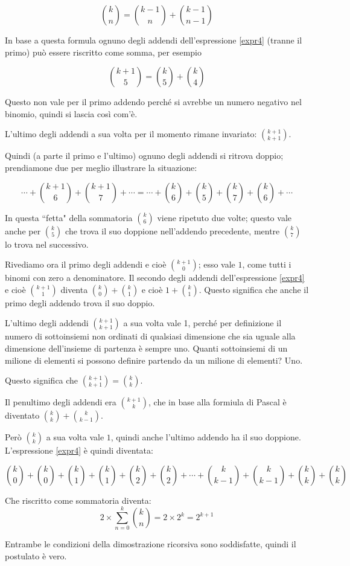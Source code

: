 \begin{equation*}
{k \choose n}={k-1 \choose n}+{k-1 \choose n-1}
\end{equation*}

In base a questa formula ognuno degli addendi dell'espressione \ref{expr4} (tranne il primo) può essere riscritto come somma, per esempio


\begin{equation*}
{k+1 \choose 5}={k \choose 5}+{k \choose 4}
\end{equation*}

Questo non vale per il primo addendo perché si avrebbe un numero negativo nel binomio, quindi si lascia così com'è.

L'ultimo degli addendi a sua volta per il momento rimane invariato: ${k+1\choose k+1}$.

Quindi (a parte il primo e l'ultimo) ognuno degli addendi si ritrova doppio; prendiamone due per meglio illustrare la situazione:

\begin{equation*}
\cdots+{k+1\choose 6}+{k+1\choose 7}+\cdots
=
\cdots+{k\choose 6}+{k \choose 5}+{k\choose 7}+{k\choose 6}+\cdots
\end{equation*}

In questa ``fetta" della sommatoria ${k\choose 6}$ viene ripetuto due volte; questo vale anche per ${k\choose 5}$ che trova il suo doppione nell'addendo precedente, mentre ${k \choose 7}$ lo trova nel successivo.

Rivediamo ora il primo degli addendi e cioè ${k+1 \choose 0}$; esso vale $1$, come tutti i binomi con zero a denominatore.
Il secondo degli addendi dell'espressione \ref{expr4} e cioè ${k+1\choose 1}$ diventa ${k\choose 0}+{k\choose 1}$ e cioè $1+{k\choose 1}$.  Questo significa che anche il primo degli addendo trova il suo doppio.

L'ultimo degli addendi ${k+1\choose k+1}$ a sua volta vale 1, perché per definizione il numero di sottoinsiemi non ordinati di qualsiasi dimensione che sia uguale alla dimensione dell'insieme di partenza è sempre uno.  Quanti sottoinsiemi di un milione di elementi si possono definire partendo da un milione di elementi?  Uno.

Questo significa che ${k+1\choose k+1}={k\choose k}$.

Il penultimo degli addendi era ${k+1\choose k}$, che in base alla formiula di Pascal è diventato ${k\choose k}+{k\choose k-1}$.

Però ${k\choose k}$ a sua volta vale $1$, quindi anche l'ultimo addendo ha il suo doppione.  L'espressione \ref{expr4} è quindi diventata:

\begin{equation*}
{k\choose 0}+{k\choose 0}+
{k\choose 1}+{k\choose 1}+
{k\choose 2}+{k\choose 2}+\cdots+
{k\choose k-1}+{k\choose k-1}+
{k\choose k}+{k\choose k}
\end{equation*}

Che riscritto come sommatoria diventa:
\begin{equation*}
2\times\sum_{n=0}^k{{k\choose n}} = 2\times2^k=2^{k+1}
\end{equation*}

Entrambe le condizioni della dimostrazione ricorsiva sono soddisfatte, quindi il postulato è vero.
